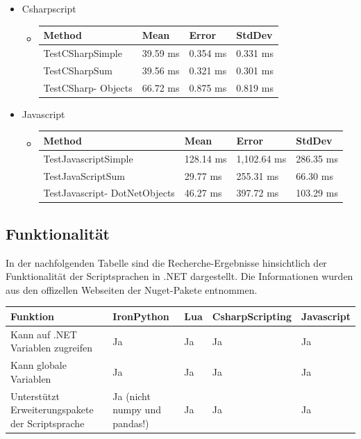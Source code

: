 \begin{itemize}
    \item Csharpscript
    \begin{itemize}
        \item \begin{table}[H]
            \begin{tabular}{|p{3.5cm}|p{3cm}|p{3cm}|p{3cm}|}
            \hline
                Method & Mean & Error & StdDev \\ \hline
                TestCSharpSimple & 39.59 ms & 0.354 ms & 0.331 ms \\ \hline
                TestCSharpSum & 39.56 ms & 0.321 ms & 0.301 ms \\ \hline
                TestCSharp-
                Objects & 66.72 ms & 0.875 ms & 0.819 ms \\ \hline
            \end{tabular}
        \end{table}
    \end{itemize}
    \item Javascript
    \begin{itemize}
        \item \begin{table}[H]
            \begin{tabular}{|p{3.5cm}|p{3cm}|p{3cm}|p{3cm}|}
            \hline
                Method & Mean & Error & StdDev \\ \hline
                TestJavascriptSimple & 128.14 ms & 1,102.64 ms & 286.35 ms  \\ \hline
                TestJavaScriptSum & 29.77 ms & 255.31 ms & 66.30 ms \\ \hline
                TestJavascript-
                DotNetObjects & 46.27 ms & 397.72 ms & 103.29 ms  \\ \hline
            \end{tabular}
        \end{table}
    \end{itemize}
\end{itemize}


\newpage
\subsection{Funktionalität}
In der nachfolgenden Tabelle sind die Recherche-Ergebnisse hinsichtlich der Funktionalität der Scriptsprachen in .NET dargestellt.
Die Informationen wurden aus den offizellen Webseiten der Nuget-Pakete entnommen.

\begin{table}[H]
    \begin{tabular}{|p{3cm}|p{3cm}|p{3cm}|p{3cm}|p{3cm}|}
        \hline
        Funktion & IronPython & Lua & CsharpScripting & Javascript\\ \hline
        Kann auf .NET Variablen zugreifen & Ja & Ja & Ja & Ja \\ \hline
        Kann globale Variablen & Ja & Ja & Ja & Ja \\ \hline
        Unterstützt Erweiterungspakete der Scriptsprache & Ja (nicht numpy und pandas!) & Ja & Ja & Ja \\ \hline 
    \end{tabular} 
\end{table}
\newpage
